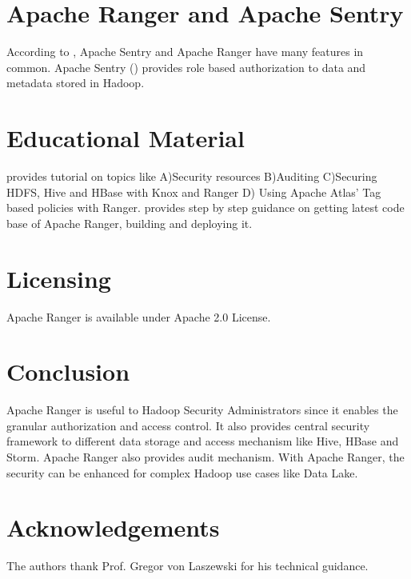 \documentclass[9pt,twocolumn,twoside]{../../styles/osajnl}
\begin{document}
\section{Apache Ranger and Apache Sentry}
According to \cite{www-5security-blog}, Apache Sentry and Apache Ranger have
many features in common. Apache Sentry (\cite{www-apache-sentry}) provides
role based authorization to data and metadata stored in Hadoop.

\section{Educational Material}
\cite{www-ranger-tutorial} provides tutorial on topics like A)Security
resources B)Auditing C)Securing HDFS, Hive and HBase with Knox and Ranger D)
Using Apache Atlas' Tag based policies with Ranger.
\cite{www-ranger-quickstart} provides step by step guidance on getting latest
code base of Apache Ranger, building and deploying it.

\section{Licensing}
Apache Ranger is available under Apache 2.0 License.

\section{Conclusion}
Apache Ranger is useful to Hadoop Security Administrators since it enables
the granular authorization and access control. It also provides central
security framework to different data storage and access mechanism like Hive,
HBase and Storm. Apache Ranger also provides audit mechanism. With Apache
Ranger, the security can be enhanced for complex Hadoop use cases like Data
Lake.

\section*{Acknowledgements}

The authors thank Prof. Gregor von Laszewski for his technical guidance.



\end{document}
